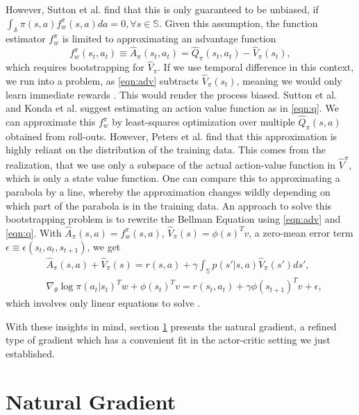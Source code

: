 \documentclass[final]{IEEEtran}
\begin{document}
However, Sutton et al. \cite{1993b} find that this is only guaranteed to be unbiased, if $\int_\mathbb{A}{\pi(s,a)f_w^\pi(s,a)da} = 0, \forall s \in \mathbb{S}$. 
Given this assumption, the function estimator $f_w^\pi$ is limited to approximating an advantage function
\begin{equation}
	f_w^\pi(s_t, a_t) \equiv \hat{A}_{\pi}(s_t, a_t) = \hat{Q}_{\pi}(s_t, a_t) - \hat{V}_{\pi}(s_t),
	\label{eqn:adv}
\end{equation} 
which requires bootstrapping for $\hat{V}_\pi$. 
If we use temporal difference in this context, we run into a problem, as \eqref{eqn:adv} subtracts $\hat{V}_\pi(s_t)$, meaning we would only learn immediate rewards \cite{Peters_IICHR_2003}. 
This would render the process biased. 
Sutton et al. \cite{Sutton:1999:PGM:3009657.3009806} and Konda et al. \cite{NIPS1999_1786} suggest estimating an action value function as in \eqref{eqn:q}. 
We can approximate this $f_w^\pi$ by least-squares optimization over multiple $\hat{Q}_\pi(s,a)$ obtained from roll-outs. 
However, Peters et al. \cite{4863} find that this approximation is highly reliant on the distribution of the training data. 
This comes from the realization, that we use only a subspace of the actual action-value function in $\hat{V}^\pi$, which is only a state value function. 
One can compare this to approximating a parabola by a line, whereby the approximation changes wildly depending on which part of the parabola is in the training data. 
An approach to solve this bootstrapping problem is to rewrite the Bellman Equation using \eqref{eqn:adv} and \eqref{eqn:q}.
With $\hat{A}_\pi(s,a) = f_w^\pi(s,a)$, $\hat{V}_\pi(s) = \phi(s)^T v$, a zero-mean error term $\epsilon \equiv \epsilon(s_t,a_t,s_{t+1})$, we get
\begin{align}
  &\hat{A}_\pi(s,a) + \hat{V}_\pi(s) = r(s,a) + \gamma \int_\mathbb{S} p(s'|s,a)\hat{V}_\pi(s')ds', \\
  &\nabla_\theta \log \pi(a_t|s_t)^T w + \phi(s_t)^T v = r(s_t,a_t) + \gamma \phi(s_{t+1})^T v + \epsilon ,
\end{align}
which involves only linear equations to solve \cite{4863}.

With these insights in mind, section \ref{sec:natural} presents the natural gradient, a refined type of gradient which has a convenient fit in the actor-critic setting we just established.

\section{Natural Gradient}
\label{sec:natural}
\end{document}
